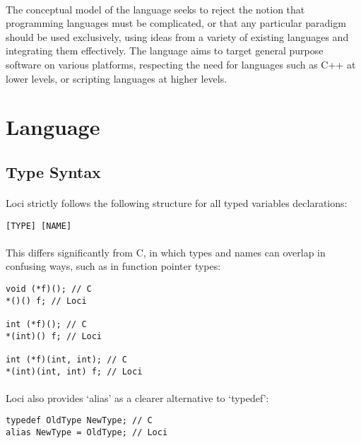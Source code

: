 \documentclass[12pt,twoside,notitlepage]{report}
\begin{document}
\paragraph{}
The conceptual model of the language seeks to reject the notion that programming languages must be complicated, or that any particular paradigm should be used exclusively, using ideas from a variety of existing languages and integrating them effectively. The language aims to target general purpose software on various platforms, respecting the need for languages such as C++ at lower levels, or scripting languages at higher levels.

\section{Language}

\subsection{Type Syntax}

\paragraph{}
Loci strictly follows the following structure for all typed variables declarations:

\begin{verbatim}
[TYPE] [NAME]
\end{verbatim}

\paragraph{}
This differs significantly from C, in which types and names can overlap in confusing ways, such as in function pointer types:

\begin{verbatim}
void (*f)(); // C
*()() f; // Loci

int (*f)(); // C
*(int)() f; // Loci

int (*f)(int, int); // C
*(int)(int, int) f; // Loci
\end{verbatim}

\paragraph{}
Loci also provides `alias' as a clearer alternative to `typedef':

\begin{verbatim}
typedef OldType NewType; // C
alias NewType = OldType; // Loci
\end{verbatim}
\end{document}

